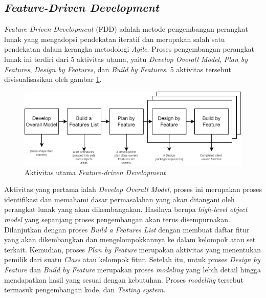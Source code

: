 \subsection{\textit{Feature-Driven Development}}
\textit{Feature-Driven Development} (FDD) adalah metode pengembangan perangkat lunak yang mengadopsi pendekatan iteratif dan merupakan salah satu pendekatan dalam kerangka metodologi \textit{Agile}.
Proses pengembangan perangkat lunak ini terdiri dari 5 aktivitas utama, yaitu \textit{Develop Overall Model}, \textit{Plan by Features}, \textit{Design by Features}, dan \textit{Build by Features}.
5 aktivitas tersebut divisualisasikan oleh gambar \ref*{Fig:FDD-langkah}.
\begin{figure}[H]
	\centering
	\includegraphics[width=\textwidth]{contents/chapter-2/images/FDD.png}
	\caption{Aktivitas utama \textit{Feature-driven Development}\cite{palmer2001practical}}
	\label{Fig:FDD-langkah}
\end{figure}
Aktivitas yang pertama ialah \textit{Develop Overall Model}, proses ini merupakan proses identifikasi dan memahami dasar permasalahan yang akan ditangani oleh perangkat lunak yang akan dikembangakan.
Hasilnya berupa \textit{high-level object model} yang sepanjang proses pengembangan akan terus disempurnakan. Dilanjutkan dengan proses \textit{Build a Features List} dengan membuat daftar fitur yang akan dikembangkan dan mengelompokkannya ke dalam kelompok atau set terkait.
Kemudian, proses \textit{Plan by Feature} merupakan aktivitas yang menentukan pemilik dari suatu \textit{Class} atau kelompok fitur.
Setelah itu, untuk proses \textit{Design by Feature} dan \textit{Build by Feature} merupakan proses \textit{modeling} yang lebih detail hingga mendapatkan hasil yang sesuai dengan kebutuhan.
Proses \textit{modeling} tersebut termasuk pengembangan kode, dan \textit{Testing system}.
